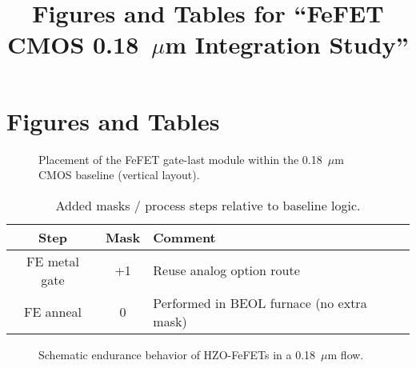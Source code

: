 \documentclass[conference]{IEEEtran}
\begin{document}
\title{Figures and Tables for ``FeFET CMOS 0.18~$\mu$m Integration Study''}
\author{}
\maketitle

\section*{Figures and Tables}

\begin{figure}[!t]\centering
\caption{Placement of the FeFET gate-last module within the 0.18~$\mu$m CMOS baseline (vertical layout).}
\end{figure}

\begin{table}[!t]\centering
\caption{Added masks / process steps relative to baseline logic.}
\begin{tabular}{|c|c|l|}\hline
Step & Mask & Comment\\ \hline
FE metal gate & +1 & Reuse analog option route\\
FE anneal & 0 & Performed in BEOL furnace (no extra mask)\\ \hline
\end{tabular}
\end{table}

\begin{figure}[!t]\centering
{}
\caption{Schematic endurance behavior of HZO-FeFETs in a 0.18~$\mu$m flow.}
\end{figure}
\end{document}
